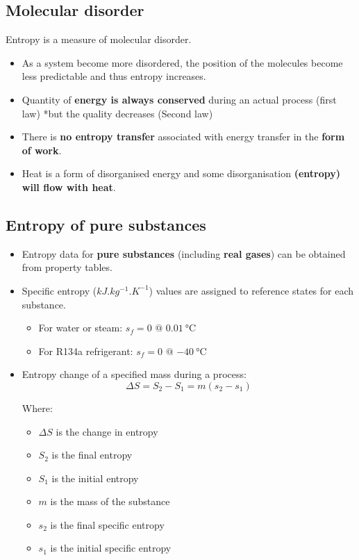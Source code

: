 \documentclass[11pt]{article}
\begin{document}
\subsection{Molecular disorder}
\label{sec:orge469b82}
Entropy is a measure of molecular disorder.
\begin{itemize}
\item As a system become more disordered, the position of the molecules become less predictable and thus entropy increases.
\item Quantity of \textbf{energy is always conserved} during an actual process (first law) *but the quality decreases (Second law)
\item There is \textbf{no entropy transfer} associated with energy transfer in the \textbf{form of work}.
\item Heat is a form of disorganised energy and some disorganisation \textbf{(entropy) will flow with heat}.
\end{itemize}
\subsection{Entropy of pure substances}
\label{sec:org60d41eb}
\begin{itemize}
\item Entropy data for \textbf{pure substances} (including \textbf{real gases}) can be obtained from property tables.
\item Specific entropy (\(\unit{kJ.kg^{-1}.K^{-1}}\)) values are assigned to reference states for each substance.
\begin{itemize}
\item For water or steam: \(s_f = 0 \text{ @ } \qty{0.01}{\degreeCelsius}\)
\item For R134a refrigerant: \(s_f = 0 \text{ @ } \qty{-40}{\degreeCelsius}\)
\end{itemize}
\item Entropy change of a specified mass during a process:
\[\Delta S = S_2 - S_1 = m(s_2 - s_1)\]

Where:
\begin{itemize}
\item \(\Delta S\) is the change in entropy
\item \(S_2\) is the final entropy
\item \(S_1\) is the initial entropy
\item \(m\) is the mass of the substance
\item \(s_2\) is the final specific entropy
\item \(s_1\) is the initial specific entropy
\end{itemize}
\end{itemize}
\end{document}
